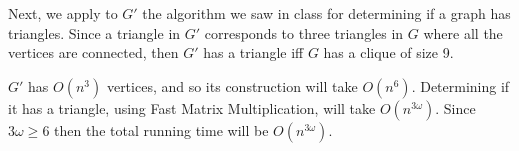 \documentclass[11pt]{article} \usepackage{amssymb}
\begin{document}
\begin{enumerate}
    Next, we apply to $G'$
    the algorithm we saw in class for determining if a graph
    has triangles. Since a triangle in $G'$ corresponds to three triangles in
    $G$ where all the vertices are connected, then $G'$ has a triangle iff
    $G$ has a clique of size 9.

    $G'$ has $O(n^3)$ vertices, and so its construction will take 
    $O(n^6)$. Determining if it has a triangle, using Fast Matrix 
    Multiplication, will take $O(n^{3\omega})$. Since $3\omega \geq 6$ 
    then the total running time will be $O(n^{3\omega})$.
    
   
\end{enumerate}
\end{document}
